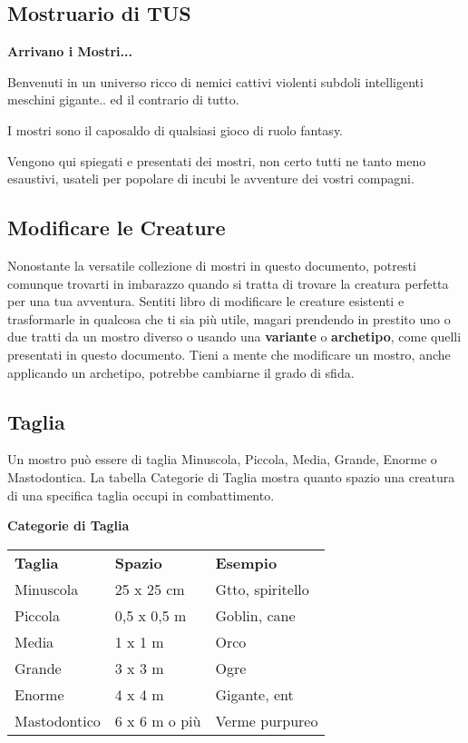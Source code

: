 \begin{multicols}{2}

	
\section{Mostruario di TUS}

\textbf{Arrivano i Mostri...}

Benvenuti in un universo ricco di nemici cattivi violenti subdoli intelligenti meschini gigante.. ed il contrario di tutto.

I mostri sono il caposaldo di qualsiasi gioco di ruolo fantasy.

Vengono qui spiegati e presentati dei mostri, non certo tutti ne tanto meno esaustivi, usateli per popolare di incubi le avventure dei vostri compagni.

\subsection{Modificare le Creature}

Nonostante la versatile collezione di mostri in questo documento, potresti comunque trovarti in imbarazzo quando si tratta di trovare la creatura perfetta per una tua avventura. Sentiti libro di modificare le creature esistenti e trasformarle in qualcosa che ti sia più utile, magari prendendo in prestito uno o due tratti da un mostro diverso o usando una \textbf{variante} o \textbf{archetipo}, come quelli presentati in questo documento. Tieni a mente che modificare un mostro, anche applicando un archetipo, potrebbe cambiarne il grado di sfida. 

\subsection{Taglia}

Un mostro può essere di taglia Minuscola, Piccola, Media, Grande, Enorme o Mastodontica. La tabella Categorie di Taglia mostra quanto spazio una creatura di una specifica taglia occupi in combattimento.

\medskip

\textbf{Categorie di Taglia}

\begin{tabular}{lll}
\toprule
\textbf{Taglia}& \textbf{Spazio} & \textbf{Esempio}\\
Minuscola & 25 x 25 cm& Gtto, spiritello\\
Piccola & 0,5 x 0,5 m & Goblin, cane\\
Media & 1 x 1 m & Orco\\
Grande & 3 x 3 m& Ogre\\
Enorme & 4 x 4 m & Gigante, ent\\
Mastodontico & 6 x 6 m o più&Verme purpureo\\
\end{tabular}


\end{multicols}
